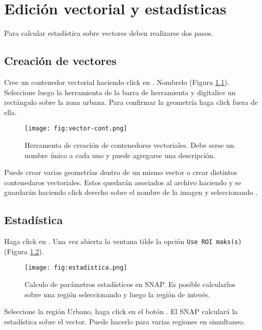 \chapter{Edición vectorial y estadísticas}\label{ap:EV}

Para calcular estadística sobre vectores deben realizarse dos pasos.

\section{Creación de vectores}

Cree un contenedor vectorial haciendo click en . Nombrelo  (Figura \ref{fig:vector-cont}). Seleccione luego la herramienta  de la barra de herramienta y digitalice un rectángulo sobre la zona urbana. Para confirmar la geometría haga click fuera de ella.

\begin{figure}[h!]
    \centering
    \texttt{[image: fig:vector-cont.png]}
    \caption{Herramenta de creación de contenedores vectoriales. Debe serse un nombre único a cada uno y puede agregarse una descripción.}
    \label{fig:vector-cont}
\end{figure}

Puede crear varias geometrías dentro de un mismo vector o crear distintos contenedaros vectoriales. Estos quedarán asociados al archivo haciendo y se guardarán haciendo click derecho sobre el nombre de la imagen y seleccionando .

\section{Estadística}

Haga click en . Una vez abierta la ventana tilde la opción \texttt{Use ROI maks(s)} (Figura \ref{fig:estadistica}).

\begin{figure}[ht!]
    \centering
    \texttt{[image: fig:estadistica.png]}
    \caption{Calculo de parámetros estadísticos en SNAP. Es posible calcularlos sobre una región seleccionando  y luego la región de interés.}
    \label{fig:estadistica}
\end{figure}

 Seleccione la región Urbano, haga click en el botón . El SNAP calculará la estadística sobre el vector. Puede hacerlo para varias regiones en simultaneo.
